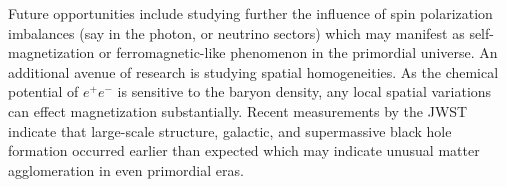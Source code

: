 \documentclass[a4paper]{article}
\begin{document}
Future opportunities include studying further the influence of spin polarization imbalances (say in the photon, or neutrino sectors) which may manifest as self-magnetization or ferromagnetic-like phenomenon in the primordial universe. An additional avenue of research is studying spatial homogeneities. As the chemical potential of $e^{+}e^{-}$ is sensitive to the baryon density, any local spatial variations can effect magnetization substantially. Recent measurements by the JWST indicate that large-scale structure, galactic, and supermassive black hole formation occurred earlier than expected which may indicate unusual matter agglomeration in even primordial eras.



\end{document}
